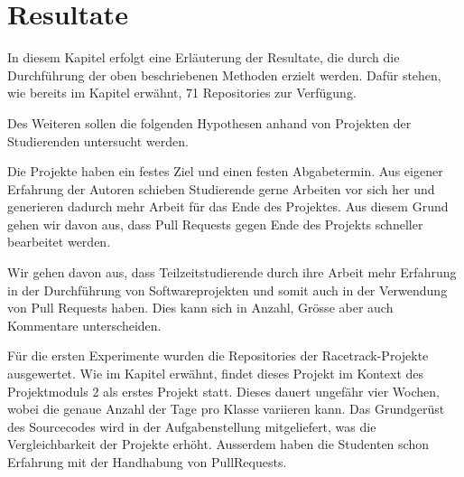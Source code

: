 


\chapter{Resultate} %

\label{Chapter4} %

In diesem Kapitel erfolgt eine Erläuterung der Resultate, die durch die Durchführung der oben beschriebenen Methoden erzielt werden. Dafür stehen, wie bereits im Kapitel  erwähnt, 71 Repositories zur Verfügung. 

Des Weiteren sollen die folgenden Hypothesen anhand von Projekten der Studierenden untersucht werden.


Die Projekte haben ein festes Ziel und einen festen Abgabetermin. Aus eigener Erfahrung der Autoren schieben Studierende gerne Arbeiten vor sich her und generieren dadurch mehr Arbeit für das Ende des Projektes. Aus diesem Grund gehen wir davon aus, dass Pull Requests gegen Ende des Projekts schneller bearbeitet werden.



Wir gehen davon aus, dass Teilzeitstudierende durch ihre Arbeit mehr Erfahrung in der Durchführung von Softwareprojekten und somit auch in der Verwendung von Pull Requests haben. Dies kann sich in Anzahl, Grösse aber auch Kommentare unterscheiden. 


Für die ersten Experimente wurden die Repositories der Racetrack-Projekte ausgewertet. Wie im Kapitel  erwähnt, findet dieses Projekt im Kontext des Projektmoduls 2 als erstes Projekt statt. Dieses dauert ungefähr vier Wochen, wobei die genaue Anzahl der Tage pro Klasse variieren kann. Das Grundgerüst des Sourcecodes wird in der Aufgabenstellung mitgeliefert, was die Vergleichbarkeit der Projekte erhöht. Ausserdem haben die Studenten schon Erfahrung mit der Handhabung von PullRequests. 

